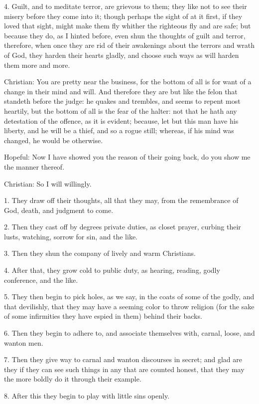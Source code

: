 4. Guilt, and to meditate terror, are grievous to them; they like not
to see their misery before they come into it; though perhaps the sight
of at it first, if they loved that sight, might make them fly whither
the righteous fly and are safe; but because they do, as I hinted
before, even shun the thoughts of guilt and terror, therefore, when
once they are rid of their awakenings about the terrors and wrath of
God, they harden their hearts gladly, and choose such ways as will
harden them more and more.

Christian: You are pretty near the business, for the bottom of all is
for want of a change in their mind and will. And therefore they are but
like the felon that standeth before the judge: he quakes and trembles,
and seems to repent most heartily, but the bottom of all is the fear of
the halter: not that he hath any detestation of the offence, as it is
evident; because, let but this man have his liberty, and he will be a
thief, and so a rogue still; whereas, if his mind was changed, he would
be otherwise.

Hopeful: Now I have showed you the reason of their going back, do you
show me the manner thereof.

Christian: So I will willingly.

1. They draw off their thoughts, all that they may, from the
remembrance of God, death, and judgment to come.

2. Then they cast off by degrees private duties, as closet prayer,
curbing their lusts, watching, sorrow for sin, and the like.

3. Then they shun the company of lively and warm Christians.

4. After that, they grow cold to public duty, as hearing, reading,
godly conference, and the like.

5. They then begin to pick holes, as we say, in the coats of some of
the godly, and that devilishly, that they may have a seeming color to
throw religion (for the sake of some infirmities they have espied in
them) behind their backs.

6. Then they begin to adhere to, and associate themselves with, carnal,
loose, and wanton men.

7. Then they give way to carnal and wanton discourses in secret; and
glad are they if they can see such things in any that are counted
honest, that they may the more boldly do it through their example.

8. After this they begin to play with little sins openly.


